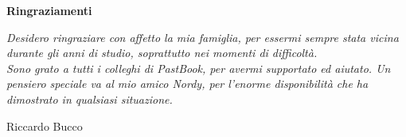 \begin{center}
	\textbf{Ringraziamenti}\\
\end{center}
\textit{Desidero ringraziare con affetto la mia famiglia, per essermi sempre stata vicina durante gli anni di studio, soprattutto nei
momenti di difficoltà.}\\
\textit{Sono grato a tutti i colleghi di PastBook, per avermi supportato ed aiutato. Un pensiero speciale va al mio amico Nordy, per l'enorme
disponibilità che ha dimostrato in qualsiasi situazione.}\\
\begin{flushright}
	Riccardo Bucco
\end{flushright}
